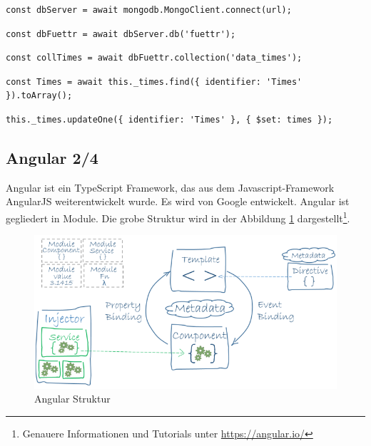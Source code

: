 \begin{lstlisting}[caption=Verbinden mit dem \ac{DBMS},style=TS]
const dbServer = await mongodb.MongoClient.connect(url);
\end{lstlisting}

\begin{lstlisting}[caption=Auswählen der Datenbank,style=TS]
const dbFuettr = await dbServer.db('fuettr');
\end{lstlisting}

\begin{lstlisting}[caption=Auswählen der Collection,style=TS]
const collTimes = await dbFuettr.collection('data_times');
\end{lstlisting}

\begin{lstlisting}[caption=Auslesen aller Datensätze mit einem Identifier,style=TS]
const Times = await this._times.find({ identifier: 'Times' }).toArray();
\end{lstlisting}

\begin{lstlisting}[caption=Überschreiben eines Datensatzes mit einem Identifier,style=TS]
this._times.updateOne({ identifier: 'Times' }, { $set: times });
\end{lstlisting}

\subsection{Angular 2/4}
\label{sec:vor-angular}
Angular ist ein TypeScript Framework, das aus dem Javascript-Framework AngularJS weiterentwickelt wurde. Es wird von Google entwickelt. Angular ist gegliedert in Module. Die grobe Struktur wird in der Abbildung \ref{Angular Struktur} dargestellt\footnote{Genauere Informationen und Tutorials unter \url{https://angular.io/}}.

\begin{figure}[H]
      \includegraphics[width=1\textwidth]{Bilder/Greistorfer/Angular}
      \caption[Angular Struktur]{Angular Struktur\protect\footnotemark}
      \label{Angular Struktur}
\end{figure}

